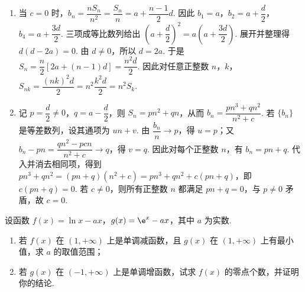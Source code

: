 \begin{solution}
\begin{enumerate}
\item 当 \(c=0\) 时，\(b_n=\dfrac{nS_n}{n^2}=\dfrac{S_n}{n}=a+\dfrac{n-1}{2}d\). 因此 \(b_1=a\)，\(b_2=a+\dfrac d2\)，\(b_4=a+\dfrac{3d}{2}\). 三项成等比数列给出
\(\left(a+\dfrac d2\right)^2=a\left(a+\dfrac{3d}{2}\right)\). 展开并整理得 \(d(d-2a)=0\). 由 \(d\ne0\)，所以 \(d=2a\). 于是
\(S_n=\dfrac n2\left[2a+(n-1)d\right]=\dfrac{n^2d}{2}\). 因此对任意正整数 \(n\)，\(k\)，
\(S_{nk}=\dfrac{(nk)^2d}{2}=n^2\dfrac{k^2d}{2}=n^2S_k\).
\item 记 \(p=\dfrac d2\ne0\)，\(q=a-\dfrac d2\)，则 \(S_n=pn^2+qn\)，从而
\(b_n=\dfrac{pn^3+qn^2}{n^2+c}\). 若 \(\{b_n\}\) 是等差数列，设其通项为 \(un+v\). 由 \(\dfrac{b_n}{n}\to p\)，得 \(u=p\)；又
\(b_n-pn=\dfrac{qn^2-pcn}{n^2+c}\to q\)，得 \(v=q\). 因此对每个正整数 \(n\)，有 \(b_n=pn+q\). 代入并消去相同项，得到
\(pn^3+qn^2=(pn+q)(n^2+c)=pn^3+qn^2+c(pn+q)\)，即 \(c(pn+q)=0\). 若 \(c\ne0\)，则所有正整数 \(n\) 都满足 \(pn+q=0\)，与 \(p\ne0\) 矛盾，故 \(c=0\).
\end{enumerate}
\end{solution}

\begin{problem}
设函数 \(f(x)=\ln x-ax\)，\(g(x)=\e^x-ax\)，其中 \(a\) 为实数.

\begin{enumerate}
\item 若 \(f(x)\) 在 \((1,+\infty)\) 上是单调减函数，且 \(g(x)\) 在 \((1,+\infty)\) 上有最小值，求 \(a\) 的取值范围；
\item 若 \(g(x)\) 在 \((-1,+\infty)\) 上是单调增函数，试求 \(f(x)\) 的零点个数，并证明你的结论.
\end{enumerate}
\end{problem}

